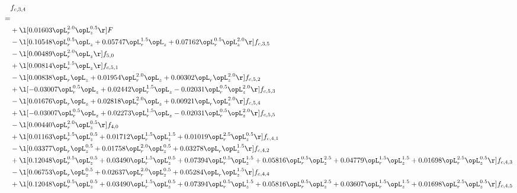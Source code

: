 \begin{alignat}{2} 
\label{eq:f_34_2} 
& f_{c,3,4} \nonumber \\ 
 = \\ 
& + \l[  0.01603 \opL_r^{2.0} \opL_z^{0.5}  \r] F \nonumber \\ 
& - \l[  0.10548 \opL_r^{0.5} \opL_z +  0.05747 \opL_r^{1.5} \opL_z +  0.07162 \opL_r^{0.5} \opL_z^{2.0}  \r] f_{c,3,5} \nonumber \\ 
& - \l[  0.00489 \opL_r^{2.0} \opL_z  \r] f_{5,0} \nonumber \\ 
& + \l[  0.00814 \opL_r^{1.5} \opL_z  \r] f_{c,5,1} \nonumber \\ 
& - \l[  0.00838 \opL_r \opL_z +  0.01954 \opL_r^{2.0} \opL_z +  0.00302 \opL_r \opL_z^{2.0}  \r] f_{c,5,2} \nonumber \\ 
& + \l[  -0.03007 \opL_r^{0.5} \opL_z +  0.02442 \opL_r^{1.5} \opL_z   -0.02031 \opL_r^{0.5} \opL_z^{2.0}  \r] f_{c,5,3} \nonumber \\ 
& - \l[  0.01676 \opL_r \opL_z +  0.02818 \opL_r^{2.0} \opL_z +  0.00921 \opL_r \opL_z^{2.0}  \r] f_{c,5,4} \nonumber \\ 
& + \l[  -0.03007 \opL_r^{0.5} \opL_z +  0.02273 \opL_r^{1.5} \opL_z   -0.02031 \opL_r^{0.5} \opL_z^{2.0}  \r] f_{c,5,5} \nonumber \\ 
& - \l[  0.00440 \opL_r^{2.0} \opL_z^{0.5}  \r] f_{4,0} \nonumber \\ 
& + \l[  0.01163 \opL_r^{1.5} \opL_z^{0.5} +  0.01712 \opL_r^{1.5} \opL_z^{1.5} +  0.01019 \opL_r^{2.5} \opL_z^{0.5}  \r] f_{c,4,1} \nonumber \\ 
& - \l[  0.03377 \opL_r \opL_z^{0.5} +  0.01758 \opL_r^{2.0} \opL_z^{0.5} +  0.03278 \opL_r \opL_z^{1.5}  \r] f_{c,4,2} \nonumber \\ 
& + \l[  0.12048 \opL_r^{0.5} \opL_z^{0.5} +  0.03490 \opL_r^{1.5} \opL_z^{0.5} +  0.07394 \opL_r^{0.5} \opL_z^{1.5} +  0.05816 \opL_r^{0.5} \opL_z^{2.5} +  0.04779 \opL_r^{1.5} \opL_z^{1.5} +  0.01698 \opL_r^{2.5} \opL_z^{0.5}  \r] f_{c,4,3} \nonumber \\ 
& - \l[  0.06753 \opL_r \opL_z^{0.5} +  0.02637 \opL_r^{2.0} \opL_z^{0.5} +  0.05284 \opL_r \opL_z^{1.5}  \r] f_{c,4,4} \nonumber \\ 
& + \l[  0.12048 \opL_r^{0.5} \opL_z^{0.5} +  0.03490 \opL_r^{1.5} \opL_z^{0.5} +  0.07394 \opL_r^{0.5} \opL_z^{1.5} +  0.05816 \opL_r^{0.5} \opL_z^{2.5} +  0.03607 \opL_r^{1.5} \opL_z^{1.5} +  0.01698 \opL_r^{2.5} \opL_z^{0.5}  \r] f_{c,4,5} \nonumber \\ 
\end{alignat} 


